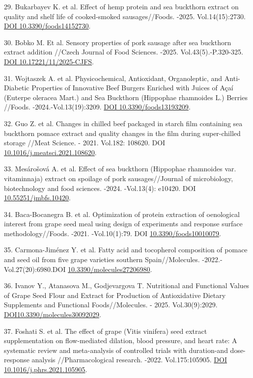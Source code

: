 \begin{refs}
29. Bukarbayev K. et al. Effect of hemp protein and sea buckthorn
extract on quality and shelf life of cooked-smoked sausages//Foods.
-2025. Vol.14(15):2730. \href{https://doi.org/10.3390/foods14152730}{DOI
10.3390/foods14152730}.

30. Bobko M. Et al. Sensory properties of pork sausage after sea
buckthorn extract addition //Czech Journal of Food Sciences. -2025.
Vol.43(5).-P.320-325. \href{https://doi.org/10.17221/11/2025-CJFS}{DOI
10.17221/11/2025-CJFS}.

31. Wojtaszek A. et al. Physicochemical, Antioxidant, Organoleptic, and
Anti-Diabetic Properties of Innovative Beef Burgers Enriched with Juices
of Açaí (Euterpe oleracea Mart.) and Sea Buckthorn (Hippophae rhamnoides
L.) Berries //Foods. -2024.-Vol.13(19):3209.
\href{https://doi.org/10.3390/foods13193209}{DOI 10.3390/foods13193209}.

32. Guo Z. et al. Changes in chilled beef packaged in starch film
containing sea buckthorn pomace extract and quality changes in the film
during super-chilled storage //Meat Science. - 2021. Vol.182: 108620.
DOI
\href{https://doi.org/10.1016/j.meatsci.2021.108620}{10.1016/j.meatsci.2021.108620}.

33. Mesárošová A. et al. Effect of sea buckthorn (Hippophae rhamnoides
var. vitaminnaja) extract on spoilage of pork sausages//Journal of
microbiology, biotechnology and food sciences. -2024. -Vol.13(4):
e10420. DOI
\href{https://doi.org/10.55251/jmbfs.10420}{10.55251/jmbfs.10420}.

34. Baca-Bocanegra B. et al. Optimization of protein extraction of
oenological interest from grape seed meal using design of experiments
and response surface methodology//Foods. -2021. -Vol.10(1):79. DOI
\href{https://doi.org/10.3390/foods10010079}{10.3390/foods10010079}.

35. Carmona-Jiménez Y. et al. Fatty acid and tocopherol composition of
pomace and seed oil from five grape varieties southern Spain//Molecules.
-2022.-Vol.27(20):6980.DOI
\href{https://doi.org/10.3390/molecules27206980}{10.3390/molecules27206980}.

36. Ivanov Y., Atanasova M., Godjevargova T. Nutritional and Functional
Values of Grape Seed Flour and Extract for Production of Antioxidative
Dietary Supplements and Functional Foods//Molecules. - 2025.
Vol.30(9):2029.
\href{https://doi.org/10.3390/molecules30092029}{DOI10.3390/molecules30092029}.

37. Foshati S. et al. The effect of grape (Vitis vinifera) seed extract
supplementation on flow-mediated dilation, blood pressure, and heart
rate: A systematic review and meta-analysis of controlled trials with
duration-and dose-response analysis //Pharmacological research. -2022.
Vol.175:105905. \href{https://doi.org/10.1016/j.phrs.2021.105905}{DOI
10.1016/j.phrs.2021.105905}.


\end{refs}
